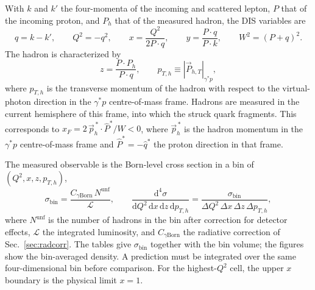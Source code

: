 \documentclass[11pt,a4paper]{article}
\newcommand{\Qsq}{Q^{2}}
\newcommand{\pTh}{p_{T,h}}
\newcommand{\Lumi}{\mathcal{L}}
\newcommand{\Cgam}{C_{\gamma\mathrm{Born}}}
\begin{document}
With $k$ and $k'$ the four-momenta of the incoming and scattered lepton, $P$ that of the incoming proton, and $P_{h}$ that of the measured hadron, the DIS variables are
\begin{equation}
  q=k-k', \qquad \Qsq=-q^{2}, \qquad x=\frac{\Qsq}{2P\cdot q}, \qquad y=\frac{P\cdot q}{P\cdot k}, \qquad W^{2}=(P+q)^{2}.
  \label{eq:dis}
\end{equation}
The hadron is characterized by
\begin{equation}
  z=\frac{P\cdot P_{h}}{P\cdot q}, \qquad \pTh\equiv\left|\vec{P}_{h,T}\right|_{\gamma^{*}p},
  \label{eq:sidis}
\end{equation}
where $\pTh$ is the transverse momentum of the hadron with respect to the virtual-photon direction in the $\gamma^{*}p$ centre-of-mass frame. Hadrons are measured in the current hemisphere of this frame, into which the struck quark fragments. This corresponds to $x_{F}=2\,\vec{p}^{\,*}_{h}\cdot\hat{P}^{*}/W<0$, where $\vec{p}^{\,*}_{h}$ is the hadron momentum in the $\gamma^{*}p$ centre-of-mass frame and $\hat{P}^{*}=-\hat{q}^{*}$ the proton direction in that frame.

The measured observable is the Born-level cross section in a bin of $(\Qsq,x,z,\pTh)$,
\begin{equation}
  \sigma_{\mathrm{bin}}=\frac{\Cgam\,N^{\mathrm{unf}}}{\Lumi},
  \qquad
  \frac{\mathrm{d}^{4}\sigma}{\mathrm{d}\Qsq\,\mathrm{d}x\,\mathrm{d}z\,\mathrm{d}\pTh}=\frac{\sigma_{\mathrm{bin}}}{\Delta\Qsq\,\Delta x\,\Delta z\,\Delta\pTh},
  \label{eq:xsec}
\end{equation}
where $N^{\mathrm{unf}}$ is the number of hadrons in the bin after correction for detector effects, $\Lumi$ the integrated luminosity, and $\Cgam$ the radiative correction of Sec.~\ref{sec:radcorr}. The tables give $\sigma_{\mathrm{bin}}$ together with the bin volume; the figures show the bin-averaged density. A prediction must be integrated over the same four-dimensional bin before comparison. For the highest-$\Qsq$ cell, the upper $x$ boundary is the physical limit $x=1$.
\end{document}
